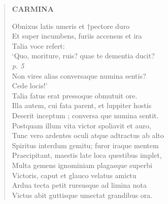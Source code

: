 \documentclass[11pt, a4paper]{report}
\begin{document}
\begin{verse}
     \marginpar{[38]} \begin{center} \textbf{CARMINA} \end{center}Obnixus latis umeris et †pectore duro \\ Et super incumbens, furiis accensus et ira \\ Talia voce refert: \\ ‘Quo, moriture, ruis? quae te dementia ducit? \\ \textit{p. 5} \\ Non vires alias conversaque numina sentis? \\ Cede locis!’ \\ Talia fatus erat pressoque obmutuit ore. \\ Illa autem, cui fata parent, et luppiter hostis \\ Deserit  \lbrack inceptum \rbrack ; conversa \lbrack que \rbrack  numina sentit. \\ Postquam illum vita victor spoliavit et auro, \\ Tunc vero ardentes oculi atque adtractus ab alto \\ Spiritus interdum gemitu; furor iraque mentem \\ Praecipitant, maestis late loca questibus implet, \\ Multa gemens ignominiam plagasque superbi \\ Victoris, caput  \lbrack et \rbrack  glauco velatus amictu \\ Ardua tecta petit rursusque ad limina nota \\ Victus abit guttisque umectat grandibus ora. \\ 
      \end{verse}
  
\end{document}

